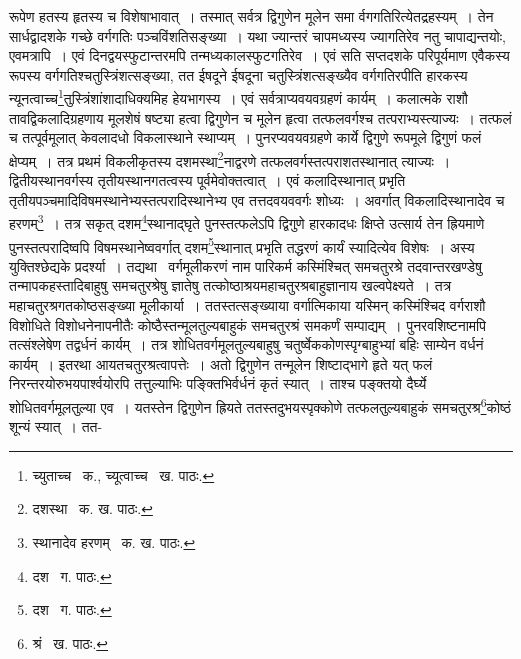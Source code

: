 \documentclass[11pt, openany]{book}
\begin{document}
{\noindent रूपेण हतस्य हृतस्य च विशेषाभावात्~। तस्मात् सर्वत्र द्विगुणेन मूलेन समा र्वगगतिरित्येतद्रहस्यम्~। तेन सार्धद्वादशके गच्छे वर्गगतिः पञ्चविंशतिसङ्ख्या~। यथा ज्यान्तरं चापमध्यस्य ज्यागतिरेव नतु चापाद्यन्तयोः, एवमत्रापि~। एवं दिनद्वयस्फुटान्तरमपि तन्मध्यकालस्फुटगतिरेव~। एवं सति सप्तदशके परिपूर्यमाण एवैकस्य रूपस्य वर्गगतिश्चतुस्त्रिंशत्सङ्ख्या, तत ईषदूने ईषदूना चतुस्त्रिंशत्सङ्ख्यैव वर्गगतिरपीति हारकस्य न्यूनत्वाच्च\renewcommand{\thefootnote}{१}\footnote{च्युताच्च \textendash\ क., च्यूत्वाच्च \textendash\ ख. पाठः.}तुस्त्रिंशांशादाधिक्यमिह हेयभागस्य~। एवं सर्वत्राप्यवयवग्रहणं कार्यम्~। कलात्मके राशौ तावद्विकलादिग्रहणाय मूलशेषं षष्ट्या हत्वा द्विगुणेन च मूलेन हृत्वा तत्फलवर्गश्च तत्पराभ्यस्त्याज्यः~। तत्फलं च तत्पूर्वमूलात् केवलादधो विकलास्थाने स्थाप्यम्~। पुनरप्यवयवग्रहणे कार्ये द्विगुणे रूपमूले द्विगुणं फलं क्षेप्यम्~। तत्र प्रथमं विकलीकृतस्य दशमस्था\renewcommand{\thefootnote}{२}\footnote{दशस्था \textendash\ क. ख. पाठः.}नाद्वरणे तत्फलवर्गस्तत्पराशतस्थानात् त्याज्यः~। द्वितीयस्थानवर्गस्य तृतीयस्थानगतत्वस्य पूर्वमेवोक्तत्वात्~। एवं कलादिस्थानात् प्रभृति तृतीयपञ्चमादिविषमस्थानेभ्यस्तत्परादिस्थानेभ्य एव तत्तदवयववर्गः शोध्यः~। अवर्गात् विकलादिस्थानादेव च हरणम्\renewcommand{\thefootnote}{३}\footnote{स्थानादेव हरणम् \textendash\ क. ख. पाठः.}~। तत्र सकृत् दशम\renewcommand{\thefootnote}{४}\footnote{दश \textendash\ ग. पाठः.}स्थानाद्घृते पुनस्तत्फलेऽपि द्विगुणे हारकादधः क्षिप्ते उत्सार्य तेन ह्रियमाणे पुनस्तत्परादिष्वपि विषमस्थानेष्ववर्गात् दशम\renewcommand{\thefootnote}{५}\footnote{दश \textendash\ ग. पाठः.}स्थानात् प्रभृति तद्धरणं कार्यं स्यादित्येव विशेषः~। अस्य युक्तिश्छेद्यके प्रदर्श्या~। तद्यथा \textendash\ वर्गमूलीकरणं नाम पारिकर्म कस्मिंश्चित् समचतुरश्रे
तदवान्तरखण्डेषु तन्मापकहस्तादिबाहुषु समचतुरश्रेषु ज्ञातेषु तत्कोष्ठाश्रयमहाचतुरश्रबाहुज्ञानाय खल्वपेक्ष्यते~। तत्र महाचतुरश्रगतकोष्ठसङ्ख्या मूलीकार्या~। ततस्तत्सङ्ख्याया वर्गात्मिकाया यस्मिन् कस्मिंश्चिद वर्गराशौ विशोधिते विशोधनेनापनीतैः कोष्ठैस्तन्मूलतुल्यबाहुकं समचतुरश्रं समकर्णं सम्पाद्यम्~। पुनरवशिष्टनामपि तत्संश्लेषेण तद्वर्धनं कार्यम्~। तत्र शोधितवर्गमूलतुल्यबाहुषु चतुर्ष्वेककोणस्पृग्बाहुभ्यां बहिः साम्येन वर्धनं कार्यम्~। इतरथा आयतचतुरश्रत्वापत्तेः~। अतो द्विगुणेन तन्मूलेन शिष्टाद्भागे हृते यत् फलं निरन्तरयोरुभयपार्श्वयोरपि तत्तुल्याभिः पङ्क्तिभिर्वर्धनं कृतं स्यात्~। ताश्च पङ्क्तयो दैर्घ्ये शोधितवर्गमूलतुल्या एव~। यतस्तेन द्विगुणेन ह्रियते ततस्तदुभयस्पृक्कोणे तत्फलतुल्यबाहुकं समचतुरश्र\renewcommand{\thefootnote}{६}\footnote{श्रं \textendash\ ख. पाठः.}कोष्ठं शून्यं स्यात्~। तत- 

\newpage

}
\end{document}
